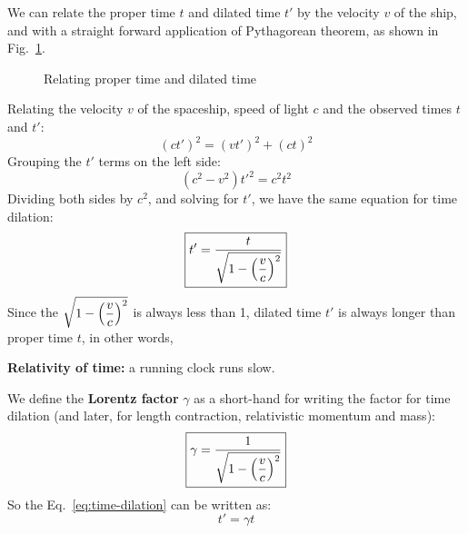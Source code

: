We can relate the proper time $t$ and dilated time $t'$ by the velocity $v$ of
the ship, and with a straight forward application of Pythagorean theorem, as
shown in Fig.~\ref{fig:time-dilation3}.
\begin{figure}[ht]
  \centering
  \caption{Relating proper time and dilated time}
  \label{fig:time-dilation3}
\end{figure}
Relating the velocity $v$ of the spaceship, speed of light $c$ and the observed
times $t$ and $t'$:
\begin{equation*}
  (ct')^2 =(vt')^2 + (ct)^2
\end{equation*}
Grouping the $t'$ terms on the left side:
\begin{equation*}
  \left(c^2-v^2\right)t'^2 =c^2t^2
\end{equation*}
Dividing both sides by $c^2$, and solving for $t'$, we have the same equation
for time dilation:
\begin{equation}
  \boxed{t'=\frac t{\sqrt{1-\left(\dfrac vc\right)^2}}}
  \label{eq:time-dilation}
\end{equation}
Since the $\sqrt{1-\left(\dfrac vc\right)^2}$ is always less than 1, dilated time $t'$ is always longer
than proper time $t$, in other words,
\begin{definition}
  \textbf{Relativity of time:} a running clock runs slow.
\end{definition}
We define the \textbf{Lorentz factor} $\gamma$ as a short-hand for writing
the factor for time dilation (and later, for length contraction, relativistic
momentum and mass):
\begin{equation}
  \boxed{\gamma=\frac1{\sqrt{1-\left(\dfrac vc\right)^2}}}
\end{equation}
So the Eq.~\ref{eq:time-dilation} can be written as:
\begin{equation}
  \boxed{
    t' =\gamma t
  }
\end{equation}

